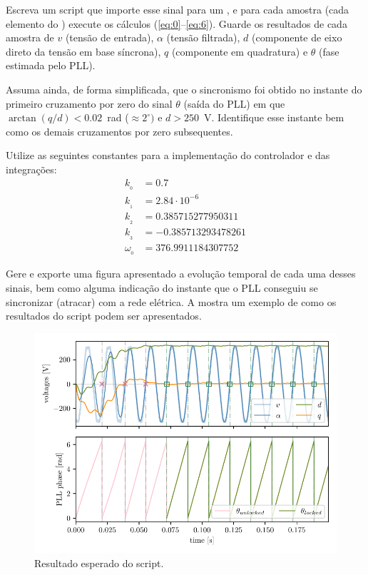 Escreva um script que importe esse sinal para um , e para cada amostra (cada elemento do )
execute os cálculos (\ref{eq:0}--\ref{eq:6}).
Guarde os resultados de cada amostra de $v$ (tensão de entrada), $\alpha$ (tensão filtrada), $d$ (componente de eixo
direto da tensão em base síncrona), $q$ (componente em quadratura) e $\theta$ (fase estimada pelo PLL).

Assuma ainda, de forma simplificada, que o sincronismo foi obtido no instante do primeiro cruzamento por zero do sinal
$\theta$ (saída do PLL) em que $\arctan(q/d) < 0.02$~rad ($\approx 2^\circ)$ e $d > 250$~V. Identifique esse instante
bem como os demais cruzamentos por zero subsequentes.

Utilize as seguintes constantes para a implementação do controlador e das integrações:
\begin{equation}\label{eq:cont}
    \begin{aligned}
        k_{_0} &= 0.7 \\
        k_{_1} &= 2.84\cdot 10^{-6} \\
        k_{_2} &= 0.385715277950311 \\
        k_{_3} &= -0.385713293478261 \\
        \omega_{_0} &= 376.9911184307752
    \end{aligned}
\end{equation}

Gere e exporte uma figura apresentado a evolução temporal de cada uma desses sinais, bem como alguma indicação do
instante que o PLL conseguiu se sincronizar (atracar) com a rede elétrica.
A  mostra um exemplo de como os resultados do script podem ser
apresentados.
\begin{figure}[htbp]
    \centering
    \includegraphics[scale=1.0]{figs/plot_pll}
    \caption{Resultado esperado do script.}
    \label{fig:plot}
\end{figure}




